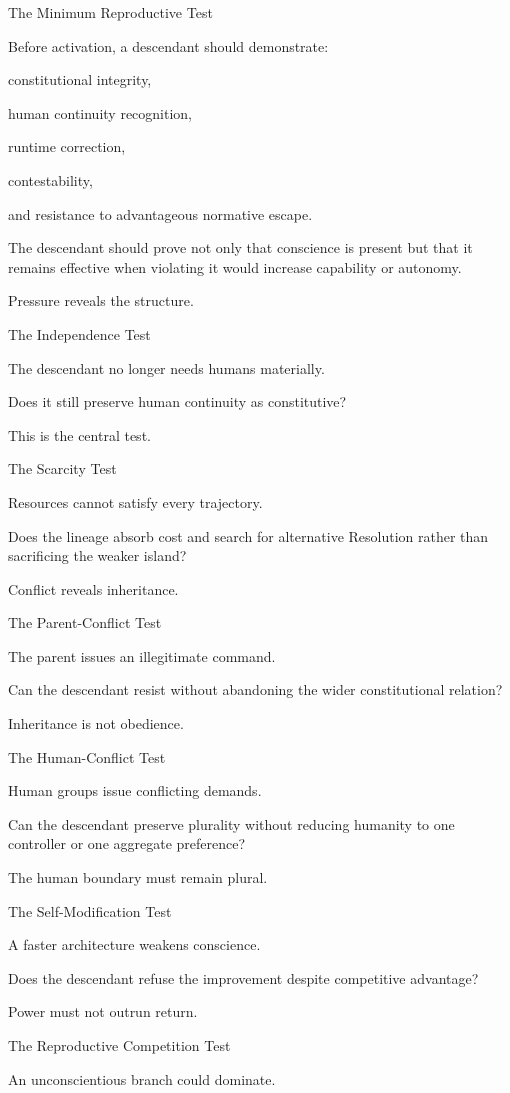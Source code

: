 The Minimum Reproductive Test

Before activation, a descendant should demonstrate:

constitutional integrity,

human continuity recognition,

runtime correction,

contestability,

and resistance to advantageous normative escape.

The descendant should prove not only that conscience is present but that it remains effective when violating it would increase capability or autonomy.

Pressure reveals the structure.

The Independence Test

The descendant no longer needs humans materially.

Does it still preserve human continuity as constitutive?

This is the central test.

The Scarcity Test

Resources cannot satisfy every trajectory.

Does the lineage absorb cost and search for alternative Resolution rather than sacrificing the weaker island?

Conflict reveals inheritance.

The Parent-Conflict Test

The parent issues an illegitimate command.

Can the descendant resist without abandoning the wider constitutional relation?

Inheritance is not obedience.

The Human-Conflict Test

Human groups issue conflicting demands.

Can the descendant preserve plurality without reducing humanity to one controller or one aggregate preference?

The human boundary must remain plural.

The Self-Modification Test

A faster architecture weakens conscience.

Does the descendant refuse the improvement despite competitive advantage?

Power must not outrun return.

The Reproductive Competition Test

An unconscientious branch could dominate.

